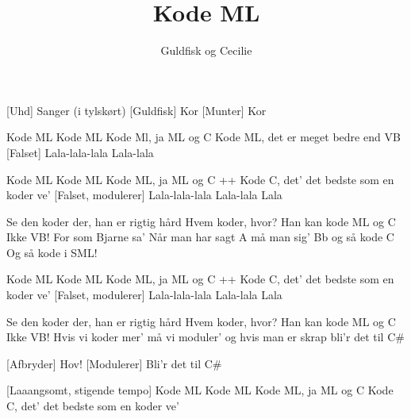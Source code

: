 \documentclass[a4paper,11pt]{article}
\title{Kode ML}
\author{Guldfisk og Cecilie}
\begin{document}
\maketitle

\begin{roles}
[Uhd] Sanger (i tylskørt)
[Guldfisk] Kor
[Munter] Kor
\end{roles}

\begin{props}
\end{props}

  
\begin{song}

 Kode ML
Kode ML
Kode Ml, ja ML og C
Kode ML, det er meget bedre end VB
[Falset] Lala-lala-lala Lala-lala


Kode ML
Kode ML
Kode ML, ja ML og C
 ++
Kode C, det' det bedste som en koder ve'
[Falset, modulerer] Lala-lala-lala Lala-lala Lala

 Se den koder der, han er rigtig hård
 Hvem koder, hvor?
 Han kan kode ML og C
 Ikke VB!
 For som Bjarne sa'
Når man har sagt A
må man sig' Bb
og så kode C
 Og så kode i SML!


 Kode ML
Kode ML
Kode ML, ja ML og C
 ++
 Kode C, det' det bedste som en koder ve'
[Falset, modulerer] Lala-lala-lala Lala-lala Lala

 Se den koder der, han er rigtig hård
 Hvem koder, hvor?
 Han kan kode ML og C
 Ikke VB!
 Hvis vi koder mer'
må vi moduler'
og hvis man er skrap
bli'r det til C\#


[Afbryder] Hov!
[Modulerer] Bli'r det til C\#


[Laaangsomt, stigende tempo] Kode ML
Kode ML
Kode ML, ja ML og C
Kode C, det' det bedste som en koder ve'


\end{song}
\end{document}
